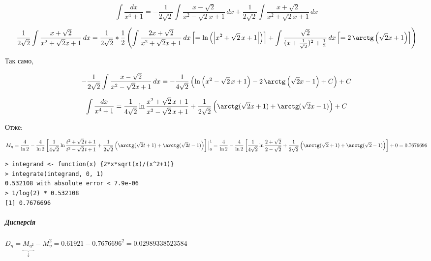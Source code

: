 \documentclass[a4paper, 12pt, oneside]{extarticle}
\begin{document}
\[
	\int \frac{dx}{x^4+1} =
	-\frac{1}{2\sqrt2} \int \frac{x-\sqrt2}{x^2-\sqrt2x+1} \,dx
	+\frac{1}{2\sqrt2} \int \frac{x+\sqrt2}{x^2+\sqrt2x+1} \,dx
\]

\begin{dmath}
	\frac{1}{2\sqrt2} \int \frac{x+\sqrt2}{x^2+\sqrt2x+1} \,dx
	=
	\frac{1}{2\sqrt2}
	*
	\frac{1}{2}
	\left(
	\int \frac{2x+\sqrt2}{x^2+\sqrt2x+1}\,dx \left[ = \ln\left(\left|{x}^{2}+\sqrt{2}\,x+1\right|\right) \right]
	+ \int \frac{\sqrt2}{(x+\frac{1}{\sqrt2})^2+\frac{1}{2}}\,dx
 \left[ =
2\,\arctg\left(\sqrt2 x + 1\right)
\right]
	\right)
\end{dmath}

Так само,

$$
	-\frac{1}{2\sqrt2} \int \frac{x-\sqrt2}{x^2-\sqrt2x+1} \,dx =
	-\frac{1}{4\sqrt2} \left(
	\ln\left({x}^{2}-\sqrt{2}\,x+1\right)-2\,\arctg\left(\sqrt2 x - 1\right)+C
	\right)
	+C
$$

$$
	\int \frac{dx}{x^4+1} =
	\frac{1}{4\sqrt2}
	\ln
	\frac{ {x}^{2}+\sqrt{2}\,x+1 }
	{ {x}^{2}-\sqrt{2}\,x+1 }
	+\frac{1}{2\sqrt2}
	\left(
	\arctg(\sqrt2 x + 1)
	+
	\arctg(\sqrt2 x - 1)
	\right)
	+C
$$

Отже:

\begin{dmath}
	M_\eta
	=
	\frac{4}{\ln 2}
	-
	\frac{4}{\ln 2}
	\left[
	\frac{1}{4\sqrt2}
	\ln
	\frac{ {t}^{2}+\sqrt{2}\,t+1 }
	{ {t}^{2}-\sqrt{2}\,t+1 }
	+\frac{1}{2\sqrt2}
	\left(
	\arctg(\sqrt2 t + 1)
	+
	\arctg(\sqrt2 t - 1)
	\right)
	\right]
	\Big|_0^1
=
	\frac{4}{\ln 2}
	-
	\frac{4}{\ln 2}
	\left[
	\frac{1}{4\sqrt2}
	\ln
	\frac{ 2+\sqrt{2} }
	{ 2-\sqrt{2} }
	+\frac{1}{2\sqrt2}
	\left(
	\arctg(\sqrt2 + 1)
	+
	\arctg(\sqrt2 - 1)
	\right)
	\right]
	+0
	= 0.7676696
\end{dmath}

\begin{verbatim}
> integrand <- function(x) {2*x*sqrt(x)/(x^2+1)}
> integrate(integrand, 0, 1)
0.532108 with absolute error < 7.9e-06
> 1/log(2) * 0.532108
[1] 0.7676696
\end{verbatim}

\subparagraph{Дисперсія}

$
D_\eta = \underbrace{M_{\eta^2}}_{\downarrow} - M_{\eta}^2
= 0.61921 - 0.7676696^2 =
0.02989338523584
$
\end{document}
